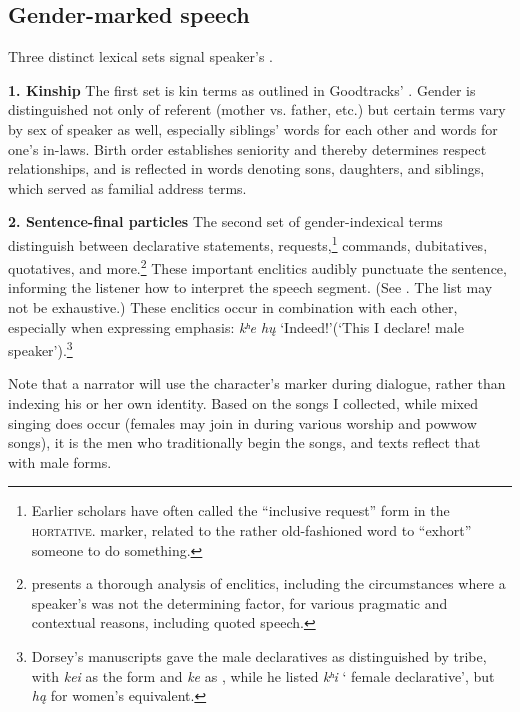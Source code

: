 \documentclass[output=paper]{LSP/langsci}
\begin{document}
\subsection{Gender-marked speech} Three distinct lexical sets signal speaker's .  

\textbf{1.  Kinship}  The first set is kin terms as outlined in Goodtracks' . Gender is distinguished not only of referent (mother vs. father, etc.) but certain terms vary by sex of speaker as well, especially siblings' words for each other and words for one's in-laws.  Birth order establishes seniority and thereby determines respect relationships, and is reflected in words denoting sons, daughters, and siblings, which served as familial address terms.

\textbf{2. Sentence-final particles} The second set of gender-indexical terms distinguish between declarative statements, requests,\footnote{Earlier scholars have often called the ``inclusive request'' form in  the \textsc{hortative.} marker, related to the rather old-fashioned word to ``exhort'' someone to do something.}  commands, dubitatives, quotatives, and more.\footnote{\citet{Trechter1995} presents a thorough analysis of  enclitics, including the circumstances where a speaker's  was not the determining factor, for various pragmatic and contextual reasons, including quoted speech.} These important enclitics audibly punctuate the sentence, informing the listener how to interpret the speech segment.   (See . The list may not be exhaustive.) These enclitics occur in combination with each other, especially when expressing emphasis: \textit{kʰe h\k{u}} `Indeed!'(`This I declare! male speaker').\footnote{Dorsey's manuscripts \citeyearpar{DorseyNDChiwere} gave the male declaratives as distinguished by tribe, with \textit{kei} as the  form and \textit{ke} as , while he listed \textit{kʰi} ` female declarative', but \textit{h\k{a}} for  women's equivalent.} 

Note that a narrator will use the character's  marker during dialogue, rather than indexing his or her own identity. Based on the songs I collected, while mixed  singing does occur (females may join in during various worship and powwow songs), it is the men who traditionally begin the songs, and texts reflect that with male forms.  
\end{document}

